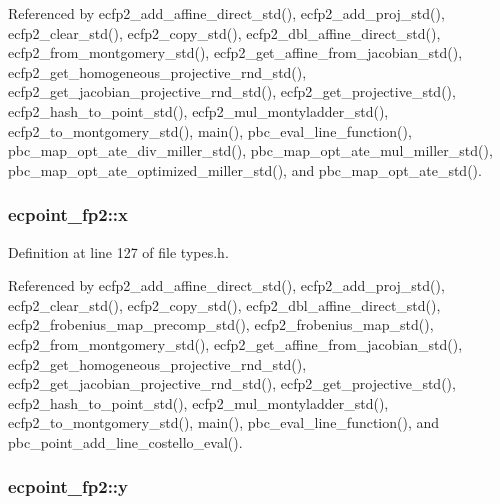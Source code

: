 Referenced by ecfp2\-\_\-add\-\_\-affine\-\_\-direct\-\_\-std(), ecfp2\-\_\-add\-\_\-proj\-\_\-std(), ecfp2\-\_\-clear\-\_\-std(), ecfp2\-\_\-copy\-\_\-std(), ecfp2\-\_\-dbl\-\_\-affine\-\_\-direct\-\_\-std(), ecfp2\-\_\-from\-\_\-montgomery\-\_\-std(), ecfp2\-\_\-get\-\_\-affine\-\_\-from\-\_\-jacobian\-\_\-std(), ecfp2\-\_\-get\-\_\-homogeneous\-\_\-projective\-\_\-rnd\-\_\-std(), ecfp2\-\_\-get\-\_\-jacobian\-\_\-projective\-\_\-rnd\-\_\-std(), ecfp2\-\_\-get\-\_\-projective\-\_\-std(), ecfp2\-\_\-hash\-\_\-to\-\_\-point\-\_\-std(), ecfp2\-\_\-mul\-\_\-montyladder\-\_\-std(), ecfp2\-\_\-to\-\_\-montgomery\-\_\-std(), main(), pbc\-\_\-eval\-\_\-line\-\_\-function(), pbc\-\_\-map\-\_\-opt\-\_\-ate\-\_\-div\-\_\-miller\-\_\-std(), pbc\-\_\-map\-\_\-opt\-\_\-ate\-\_\-mul\-\_\-miller\-\_\-std(), pbc\-\_\-map\-\_\-opt\-\_\-ate\-\_\-optimized\-\_\-miller\-\_\-std(), and pbc\-\_\-map\-\_\-opt\-\_\-ate\-\_\-std().

\hypertarget{structecpoint__fp2_aa6108d5dc8f23602e749baa8c6869bf7}{
\subsubsection[{x}]{ ecpoint\-\_\-fp2\-::x}}\label{structecpoint__fp2_aa6108d5dc8f23602e749baa8c6869bf7}


Definition at line 127 of file types.\-h.



Referenced by ecfp2\-\_\-add\-\_\-affine\-\_\-direct\-\_\-std(), ecfp2\-\_\-add\-\_\-proj\-\_\-std(), ecfp2\-\_\-clear\-\_\-std(), ecfp2\-\_\-copy\-\_\-std(), ecfp2\-\_\-dbl\-\_\-affine\-\_\-direct\-\_\-std(), ecfp2\-\_\-frobenius\-\_\-map\-\_\-precomp\-\_\-std(), ecfp2\-\_\-frobenius\-\_\-map\-\_\-std(), ecfp2\-\_\-from\-\_\-montgomery\-\_\-std(), ecfp2\-\_\-get\-\_\-affine\-\_\-from\-\_\-jacobian\-\_\-std(), ecfp2\-\_\-get\-\_\-homogeneous\-\_\-projective\-\_\-rnd\-\_\-std(), ecfp2\-\_\-get\-\_\-jacobian\-\_\-projective\-\_\-rnd\-\_\-std(), ecfp2\-\_\-get\-\_\-projective\-\_\-std(), ecfp2\-\_\-hash\-\_\-to\-\_\-point\-\_\-std(), ecfp2\-\_\-mul\-\_\-montyladder\-\_\-std(), ecfp2\-\_\-to\-\_\-montgomery\-\_\-std(), main(), pbc\-\_\-eval\-\_\-line\-\_\-function(), and pbc\-\_\-point\-\_\-add\-\_\-line\-\_\-costello\-\_\-eval().

\hypertarget{structecpoint__fp2_abde52907800a97b34eb4cd2cae674640}{
\subsubsection[{y}]{ ecpoint\-\_\-fp2\-::y}}\label{structecpoint__fp2_abde52907800a97b34eb4cd2cae674640}


